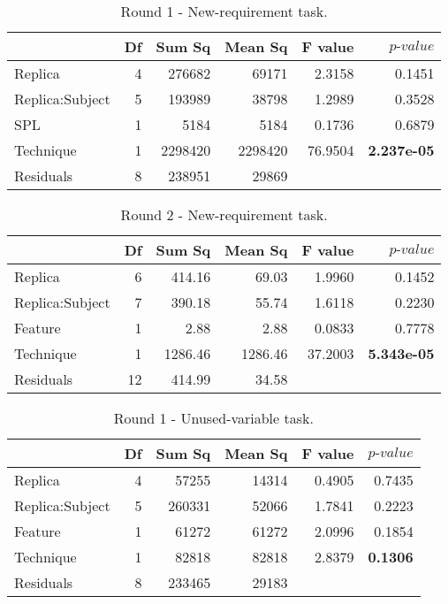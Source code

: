 \documentclass{sig-alternate}
\begin{document}
\begin{table}[h]
\begin{center}
\footnotesize
\begin{tabular}{lrrrrr}
\hline
& Df & Sum Sq & Mean Sq & F value & $p\mbox{-}value$ \\
\hline
Replica & 4 & 276682 & 69171 & 2.3158 & 0.1451 \\
Replica:Subject & 5 & 193989 & 38798 & 1.2989 & 0.3528 \\
SPL & 1 & 5184 & 5184 & 0.1736 & 0.6879 \\
Technique & 1 & 2298420 & 2298420 & 76.9504 & {\bf 2.237e-05} \\
Residuals & 8 & 238951 & 29869 & & \\
\hline
\end{tabular}
\normalsize
\end{center}
\caption{Round 1 - New-requirement task.}
\label{tab:anova-r1-m1}
\end{table}

\begin{table}[h]
\begin{center}
\footnotesize
\begin{tabular}{lrrrrr}
\hline
& Df & Sum Sq & Mean Sq & F value & $p\mbox{-}value$ \\
\hline
Replica & 6 & 414.16 & 69.03 & 1.9960 & 0.1452 \\
Replica:Subject & 7 & 390.18 & 55.74 & 1.6118 & 0.2230 \\
Feature & 1 & 2.88 & 2.88 & 0.0833 & 0.7778 \\
Technique & 1 & 1286.46 & 1286.46 & 37.2003 & {\bf 5.343e-05} \\
Residuals & 12 & 414.99 & 34.58 & & \\
\hline
\end{tabular}
\normalsize
\end{center}
\caption{Round 2 - New-requirement task.}
\label{tab:anova-r2-m1}
\end{table}

\begin{table}[h]
\begin{center}
\footnotesize
\begin{tabular}{lrrrrr}
\hline
& Df & Sum Sq & Mean Sq & F value & $p\mbox{-}value$ \\
\hline
Replica & 4 & 57255 & 14314 & 0.4905 & 0.7435 \\
Replica:Subject & 5 & 260331 & 52066 & 1.7841 & 0.2223 \\
Feature & 1 & 61272 & 61272 & 2.0996 & 0.1854 \\
Technique & 1 & 82818 & 82818 & 2.8379 & {\bf 0.1306} \\
Residuals & 8 & 233465 & 29183 & & \\
\hline
\end{tabular}
\normalsize
\end{center}
\caption{Round 1 - Unused-variable task.}
\label{tab:anova-r1-m2}
\end{table}
\end{document}
